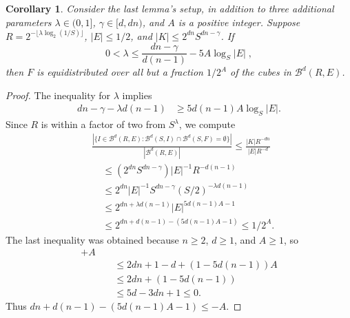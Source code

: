 \documentclass[usenames,dvipsnames]{article}
\theoremstyle{plain}
\newtheorem{corollary}{Corollary}
\theoremstyle{plain}
\begin{document}
\begin{corollary}
	Consider the last lemma's setup, in addition to three additional parameters $\lambda \in (0,1]$, $\gamma \in [d,dn)$, and $A$ is a positive integer. Suppose $R = 2^{- \lfloor \lambda \log_2(1/S) \rfloor}$, $|E| \leq 1/2$, and $|K| \leq 2^{dn} S^{dn-\gamma}$. If
	\[ 0 < \lambda \leq \frac{dn - \gamma}{d(n-1)} - 5 A \log_S |E|\; , \]
	then $F$ is equidistributed over all but a fraction $1/2^A$ of the cubes in $\mathcal{B}^d(R,E)$.
\end{corollary}
\begin{proof}
	The inequality for $\lambda$ implies
	\begin{align*}
		dn - \gamma - \lambda d(n-1) &\geq 5d(n-1) A \log_S |E|.
	\end{align*}
	Since $R$ is within a factor of two from $S^\lambda$, we compute
	\begin{align*}
		&\frac{|\{ I \in \mathcal{B}^d(R,E): \mathcal{B}^d(S,I) \cap \mathcal{B}^d(S,F) = \emptyset \}|}{|\mathcal{B}^d(R,E)|} \leq \frac{|K| R^{-dn}}{|E|R^{-d}}\\
		&\ \ \ \ \ \leq (2^{dn} S^{dn - \gamma}) |E|^{-1} R^{-d(n-1)}\\
		&\ \ \ \ \ \leq 2^{dn} |E|^{-1} S^{dn - \gamma} (S/2)^{- \lambda d(n-1)}\\
		&\ \ \ \ \ \leq 2^{dn + \lambda d(n-1)} |E|^{5d(n-1)A - 1}\\
		&\ \ \ \ \ \leq 2^{dn + d(n-1) - (5d(n-1)A - 1)} \leq 1/2^A.
	\end{align*}
	The last inequality was obtained because $n \geq 2$, $d \geq 1$, and $A \geq 1$, so
	\begin{align*}
		[dn + &d(n-1) - (5d(n-1)A - 1)] + A\\
		&\ \ \ \ \ \leq 2dn + 1 - d + (1 - 5d(n-1)) A\\
		&\ \ \ \ \ \leq 2dn + (1 - 5d(n-1))\\
		&\ \ \ \ \ \leq 5d-3dn + 1 \leq 0.
	\end{align*}
	Thus $dn + d(n-1) - (5d(n-1)A - 1) \leq -A$.
\end{proof}
\end{document}
